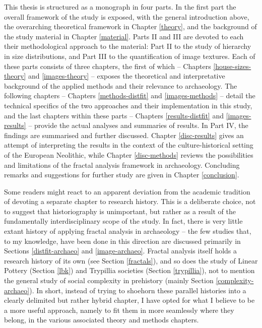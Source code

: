 \documentclass[
  12pt,
]{book}
\begin{document}
This thesis is structured as a monograph in four parts. In the first part the overall framework of the study is exposed, with the general introduction above, the overarching theoretical framework in Chapter \ref{theory}, and the background of the study material in Chapter \ref{material}. Parts II and III are devoted to each their methodological approach to the material: Part II to the study of hierarchy in size distributions, and Part III to the quantification of image textures. Each of these parts consists of three chapters, the first of which -- Chapters \ref{house-sizes-theory} and \ref{images-theory} -- exposes the theoretical and interpretative background of the applied methods and their relevance to archaeology. The following chapters -- Chapters \ref{methods-distfit} and \ref{images-methods} -- detail the technical specifics of the two approaches and their implementation in this study, and the last chapters within these parts -- Chapters \ref{results-distfit} and \ref{images-results} -- provide the actual analyses and summaries of results. In Part IV, the findings are summarised and further discussed. Chapter \ref{disc-results} gives an attempt of interpreting the results in the context of the culture-historical setting of the European Neolithic, while Chapter \ref{disc-methods} reviews the possibilities and limitations of the fractal analysis framework in archaeology. Concluding remarks and suggestions for further study are given in Chapter \ref{conclusion}.

Some readers might react to an apparent deviation from the academic tradition of devoting a separate chapter to research history. This is a deliberate choice, not to suggest that historiography is unimportant, but rather as a result of the fundamentally interdisciplinary scope of the study. In fact, there is very little extant history of applying fractal analysis in archaeology -- the few studies that, to my knowledge, have been done in this direction are discussed primarily in Sections \ref{distfit-archaeo} and \ref{image-archaeo}. Fractal analysis itself holds a research history of its own (see Section \ref{fractals}), and so does the study of Linear Pottery (Section \ref{lbk}) and Trypillia societies (Section \ref{trypillia}), not to mention the general study of social complexity in prehistory (mainly Section \ref{complexity-archaeo}). In short, instead of trying to shoehorn these parallel histories into a clearly delimited but rather hybrid chapter, I have opted for what I believe to be a more useful approach, namely to fit them in more seamlessly where they belong, in the various associated theory and methods chapters.
\end{document}
